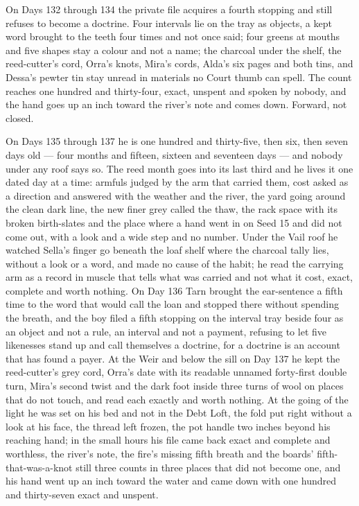\documentclass{design/chronicle}
\begin{document}
{On Days 132 through 134 the private file acquires a fourth stopping and still refuses to become a doctrine. Four intervals lie on the tray as objects, a kept word brought to the teeth four times and not once said; four greens at mouths and five shapes stay a colour and not a name; the charcoal under the shelf, the reed-cutter’s cord, Orra’s knots, Mira’s cords, Alda’s six pages and both tins, and Dessa’s pewter tin stay unread in materials no Court thumb can spell. The count reaches one hundred and thirty-four, exact, unspent and spoken by nobody, and the hand goes up an inch toward the river’s note and comes down. Forward, not closed.

On Days 135 through 137 he is one hundred and thirty-five, then six, then seven days old — four months and fifteen, sixteen and seventeen days — and nobody under any roof says so. The reed month goes into its last third and he lives it one dated day at a time: armfuls judged by the arm that carried them, cost asked as a direction and answered with the weather and the river, the yard going around the clean dark line, the new finer grey called the thaw, the rack space with its broken birth-slates and the place where a hand went in on Seed 15 and did not come out, with a look and a wide step and no number. Under the Vail roof he watched Sella’s finger go beneath the loaf shelf where the charcoal tally lies, without a look or a word, and made no cause of the habit; he read the carrying arm as a record in muscle that tells what was carried and not what it cost, exact, complete and worth nothing. On Day 136 Tarn brought the ear-sentence a fifth time to the word that would call the loan and stopped there without spending the breath, and the boy filed a fifth stopping on the interval tray beside four as an object and not a rule, an interval and not a payment, refusing to let five likenesses stand up and call themselves a doctrine, for a doctrine is an account that has found a payer. At the Weir and below the sill on Day 137 he kept the reed-cutter’s grey cord, Orra’s date with its readable unnamed forty-first double turn, Mira’s second twist and the dark foot inside three turns of wool on places that do not touch, and read each exactly and worth nothing. At the going of the light he was set on his bed and not in the Debt Loft, the fold put right without a look at his face, the thread left frozen, the pot handle two inches beyond his reaching hand; in the small hours his file came back exact and complete and worthless, the river’s note, the fire’s missing fifth breath and the boards’ fifth-that-was-a-knot still three counts in three places that did not become one, and his hand went up an inch toward the water and came down with one hundred and thirty-seven exact and unspent.

}
\end{document}
